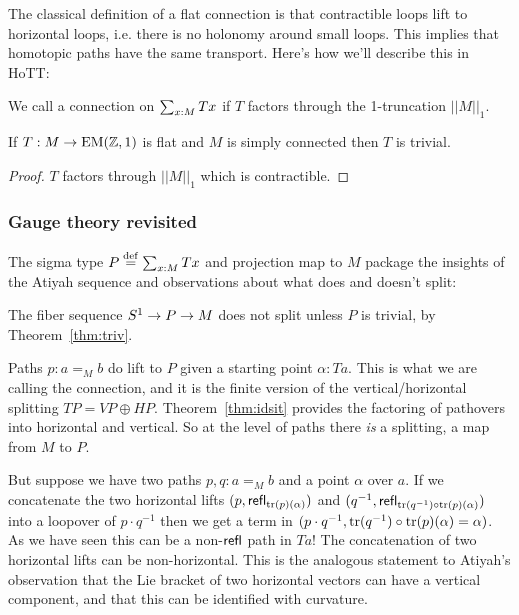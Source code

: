 The classical definition of a flat connection is that contractible loops lift to horizontal loops, i.e. there is no holonomy around small loops. This implies that homotopic paths have the same transport. Here's how we'll describe this in HoTT:
\begin{mydef}
We call a connection on \( \sum_{x:M}Tx \)  if \( T \) factors through the 1-truncation \( ||M||_1 \).
\end{mydef}

\begin{mylemma}
If \( T:M\to\mathrm{EM}(\mathbb{Z},1) \) is flat and \( M \) is simply connected then \( T \) is trivial.
\end{mylemma}
\begin{proof}
\( T \) factors through \( ||M||_1 \) which is contractible.
\end{proof}

\subsubsection{Gauge theory revisited}

The sigma type \( P\stackrel{\mathrm{def}}{=}\sum_{x:M}Tx \) and projection map to \( M \) package the insights of the Atiyah sequence and observations about what does and doesn't split:

The fiber sequence \( S^1\to P\to M \) does not split unless \( P \) is trivial, by Theorem~\ref{thm:triv}.

Paths \( p:a=_M b \) do lift to \( P \) given a starting point \( \alpha:Ta \). This is what we are calling the connection, and it is the finite version of the vertical/horizontal splitting \( TP=VP\oplus HP \). Theorem~\ref{thm:idsit} provides the factoring of pathovers into horizontal and vertical. So at the level of paths there \emph{is} a splitting, a map from \( M \) to \( P \).

But suppose we have two paths \( p,q:a=_M b \) and a point \( \alpha \) over \( a \). If we concatenate the two horizontal lifts \( (p,\mathsf{refl}_{\mathrm{tr}(p)(\alpha)}) \) and \( (q^{-1}, \mathsf{refl}_{\mathrm{tr}(q^{-1})\circ\mathrm{tr}(p)(\alpha)}) \) into a loopover of \( p\cdot q^{-1} \) then we get a term in \( (p\cdot q^{-1}, \mathrm{tr}(q^{-1})\circ\mathrm{tr}(p)(\alpha)=\alpha) \). As we have seen this can be a non-\( \mathsf{refl} \) path in \( Ta \)! The concatenation of two horizontal lifts can be non-horizontal. This is the analogous statement to Atiyah's observation that the Lie bracket of two horizontal vectors can have a vertical component, and that this can be identified with curvature.

